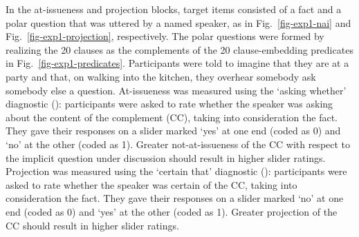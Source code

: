 \documentclass[11pt,fleqn]{article}
\newcommand{\6}{\mbox{$[\hspace*{-.6mm}[$}}
\newcommand{\9}{\mbox{$]\hspace*{-.6mm}]$}}
\begin{document}
In the at-issueness and projection blocks, target items consisted of a fact and a polar question that was uttered by a named speaker, as in Fig.~\ref{fig-exp1-nai} and Fig.~\ref{fig-exp1-projection}, respectively. The polar questions were formed by realizing the 20 clauses as the complements of the 20 clause-embedding predicates  in Fig.~\ref{fig-exp1-predicates}. Participants were told to imagine that they are at a party and that, on walking into the kitchen, they overhear somebody ask somebody else a question. At-issueness was measured using the `asking whether' diagnostic (\citealt{tbd-variability}): participants were asked to rate whether the speaker was asking about the content of the complement (CC), taking into consideration the fact. They gave their responses on a slider marked `yes' at one end (coded as 0) and `no' at the other (coded as 1). Greater not-at-issueness of the CC with respect to the implicit question under discussion should result in higher slider ratings. Projection was measured using the `certain that' diagnostic (\citealt{tbd-variability, mahler2020}): participants were asked to rate whether the speaker was certain of the CC, taking into consideration the fact. They gave their responses on a slider marked `no' at one end (coded as 0) and `yes' at the other (coded as 1). Greater projection of the CC should result in higher slider ratings. 
\end{document}
